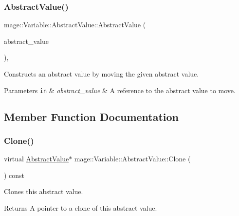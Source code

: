 \subsubsection{\texorpdfstring{Abstract\+Value()}{AbstractValue()}\hspace{0.1cm}{\footnotesize\ttfamily [3/3]}}
{\footnotesize\ttfamily mage\+::\+Variable\+::\+Abstract\+Value\+::\+Abstract\+Value (\begin{DoxyParamCaption}\item[{\hyperlink{structmage_1_1_variable_1_1_abstract_value}{Abstract\+Value} \&\&}]{abstract\+\_\+value }\end{DoxyParamCaption})\hspace{0.3cm}{\ttfamily [protected]}, {\ttfamily [default]}}

Constructs an abstract value by moving the given abstract value.


\begin{DoxyParams}[1]{Parameters}
\mbox{\tt in}  & {\em abstract\+\_\+value} & A reference to the abstract value to move. \\
\hline
\end{DoxyParams}


\subsection{Member Function Documentation}
\hypertarget{structmage_1_1_variable_1_1_abstract_value_aa81140618fdb83ad33f56322a043e23f}{}\label{structmage_1_1_variable_1_1_abstract_value_aa81140618fdb83ad33f56322a043e23f} 
\subsubsection{\texorpdfstring{Clone()}{Clone()}}
{\footnotesize\ttfamily virtual \hyperlink{structmage_1_1_variable_1_1_abstract_value}{Abstract\+Value}$\ast$ mage\+::\+Variable\+::\+Abstract\+Value\+::\+Clone (\begin{DoxyParamCaption}{ }\end{DoxyParamCaption}) const\hspace{0.3cm}{\ttfamily [pure virtual]}}

Clones this abstract value.

\begin{DoxyReturn}{Returns}
A pointer to a clone of this abstract value. 
\end{DoxyReturn}



